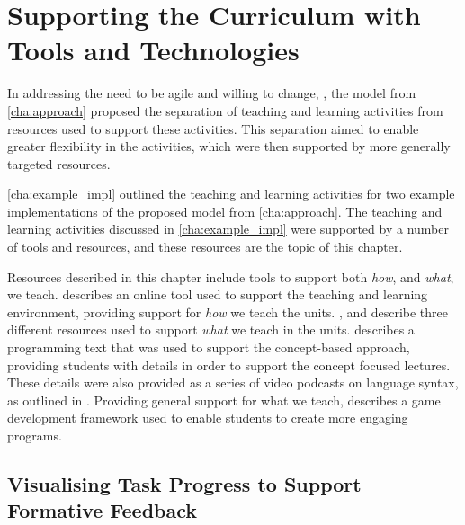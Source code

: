 
\chapter{Supporting the Curriculum with Tools and Technologies} %
\label{cha:supporting}

\graphicspath{{Figures/Supporting/}}

In addressing the need to be agile and willing to change, , the model from \cref{cha:approach} proposed the separation of teaching and learning activities from resources used to support these activities. This separation aimed to enable greater flexibility in the activities, which were then supported by more generally targeted resources.

\cref{cha:example_impl} outlined the teaching and learning activities for two example implementations of the proposed model from \cref{cha:approach}. The teaching and learning activities discussed in \cref{cha:example_impl} were supported by a number of tools and resources, and these resources are the topic of this chapter.

Resources described in this chapter include tools to support both \emph{how}, and \emph{what}, we teach.  describes an online tool used to support the teaching and learning environment, providing support for \emph{how} we teach the units. ,  and  describe three different resources used to support \emph{what} we teach in the units.  describes a programming text that was used to support the concept-based approach, providing students with details in order to support the concept focused lectures. These details were also provided as a series of video podcasts on language syntax, as outlined in . Providing general support for what we teach,  describes a game development framework used to enable students to create more engaging programs.


\section{Visualising Task Progress to Support Formative Feedback} %
\label{sec:doubtfire}


